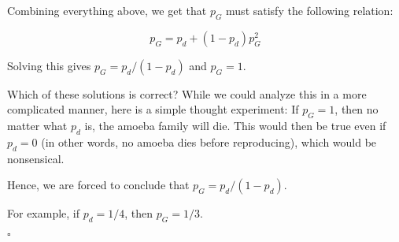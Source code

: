 
Combining everything above, we get that $p_G$ must satisfy the following relation:

\begin{equation}
p_G = p_d + (1-p_d)p_G^2
\end{equation}

Solving this gives $p_G = p_d / (1 - p_d)$ and $p_G = 1$. 

Which of these solutions is correct? While we could analyze this in a more complicated manner, here is a simple thought experiment: If $p_G = 1$, then no matter what $p_d$ is, the amoeba family will die. This would then be true even if $p_d = 0$ (in other words, no amoeba dies before reproducing), which would be nonsensical. 


Hence, we are forced to conclude that $p_G = p_d / (1 - p_d)$.


For example, if $p_d = 1/4$, then $p_G = 1/3$.

$\square$









